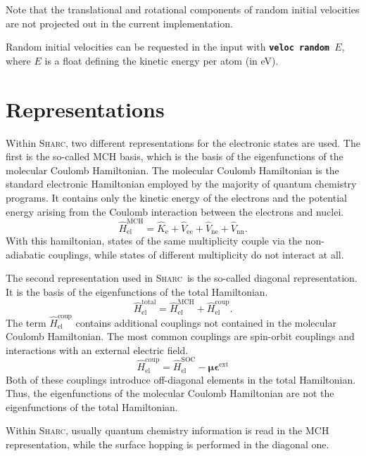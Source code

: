 \documentclass[a4paper,11pt,DIV=15,openany,twoside=false]{scrbook}
\newcommand{\sharc}{\textsc{Sharc}}
\newcommand{\ttt}[1]{\textbf{\texttt{#1}}}
\begin{document}
Note that the translational and rotational components of random initial velocities are not projected out in the current implementation.

Random initial velocities can be requested in the input with \ttt{veloc random $E$}, where $E$ is a float defining the kinetic energy per atom (in eV).


\section{Representations}\label{sec:repr}

Within \sharc, two different representations for the electronic states are used. The first is the so-called MCH basis, which is the basis of the eigenfunctions of the molecular Coulomb Hamiltonian. The molecular Coulomb Hamiltonian is the standard electronic Hamiltonian employed by the majority of quantum chemistry programs. It contains only the kinetic energy of the electrons and the potential energy arising from the Coulomb interaction between the electrons and nuclei.
\begin{equation}
  \hat{H}_{\text{el}}^{\text{MCH}}
  =\hat{K}_{\text{e}}
  +\hat{V}_{\text{ee}}
  +\hat{V}_{\text{ne}}
  +\hat{V}_{\text{nn}}.
\end{equation}
With this hamiltonian, states of the same multiplicity couple via the non-adiabatic couplings, while states of different multiplicity do not interact at all. 

The second representation used in \sharc\ is the so-called diagonal representation. It is the basis of the eigenfunctions of the total Hamiltonian.
\begin{equation}
  \hat{H}_{\text{el}}^{\text{total}}
  =\hat{H}_{\text{el}}^{\text{MCH}}
  +\hat{H}_{\text{el}}^{\text{coup}}.
\end{equation}
The term $\hat{H}_{\text{el}}^{\text{coup}}$ contains additional couplings not contained in the molecular Coulomb Hamiltonian. The most common couplings are spin-orbit couplings and interactions with an external electric field.
\begin{equation}
  \hat{H}_{\text{el}}^{\text{coup}}=\hat{H}_{\text{el}}^{\text{SOC}}-\boldsymbol{\mu}\boldsymbol{\epsilon}^{\text{ext}}
\end{equation}
Both of these couplings introduce off-diagonal elements in the total Hamiltonian. Thus, the eigenfunctions of the molecular Coulomb Hamiltonian are not the eigenfunctions of the total Hamiltonian. 

Within \sharc, usually quantum chemistry information is read in the MCH representation, while the surface hopping is performed in the diagonal one.
\end{document}
